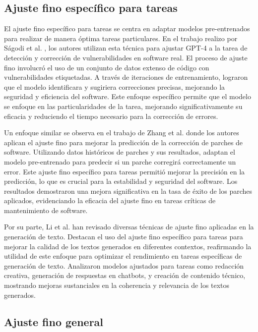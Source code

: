 \subsection{Ajuste fino específico para tareas}

El ajuste fino específico para tareas se centra en adaptar modelos pre-entrenados para realizar de manera óptima tareas particulares. En el trabajo realizo por Ságodi et al. \cite{Sagodi2024}, los autores utilizan esta técnica para ajustar GPT-4 a la tarea de detección y corrección de vulnerabilidades en software real. El proceso de ajuste fino involucró el uso de un conjunto de datos extenso de código con vulnerabilidades etiquetadas. A través de iteraciones de entrenamiento, lograron que el modelo identificara y sugiriera correcciones precisas, mejorando la seguridad y eficiencia del software. Este enfoque específico permite que el modelo se enfoque en las particularidades de la tarea, mejorando significativamente su eficacia y reduciendo el tiempo necesario para la corrección de errores.

Un enfoque similar se observa en el trabajo de Zhang et al. \cite{Zhang2024} donde los autores aplican el ajuste fino para mejorar la predicción de la corrección de parches de software. Utilizando datos históricos de parches y sus resultados, adaptan el modelo pre-entrenado para predecir si un parche corregirá correctamente un error. Este ajuste fino específico para tareas permitió mejorar la precisión en la predicción, lo que es crucial para la estabilidad y seguridad del software. Los resultados demostraron una mejora significativa en la tasa de éxito de los parches aplicados, evidenciando la eficacia del ajuste fino en tareas críticas de mantenimiento de software.

Por su parte, Li et al. \cite{JunyiLi2024} han revisado diversas técnicas de ajuste fino aplicadas en la generación de texto. Destacan el uso del ajuste fino específico para tareas para mejorar la calidad de los textos generados en diferentes contextos, reafirmando la utilidad de este enfoque para optimizar el rendimiento en tareas específicas de generación de texto. Analizaron modelos ajustados para tareas como redacción creativa, generación de respuestas en chatbots, y creación de contenido técnico, mostrando mejoras sustanciales en la coherencia y relevancia de los textos generados.

\subsection{Ajuste fino general}

